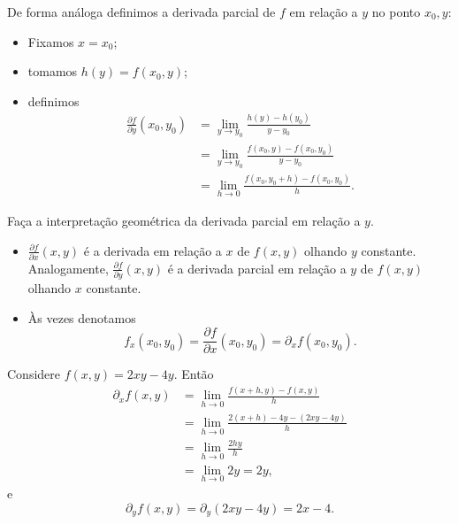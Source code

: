     De forma análoga definimos a derivada parcial de \(f\) em relação a \(y\) no ponto \(x_0,y\):
        \begin{itemize}
            \item Fixamos \(x = x_0\);
            \item tomamos \(h(y) = f(x_0,y)\);
            \item definimos
                \begin{align*}
                    \frac{\partial f}{\partial y}(x_0,y_0) 
                        & = \lim_{y\to y_0} \frac{h(y) - h(y_0)}{y-y_0} \\
                        & = \lim_{y\to y_0} \frac{f(x_0,y) - f(x_0,y_0)}{y-y_0} \\
                        & = \lim_{h\to 0} \frac{f(x_0,y_0 + h) - f(x_0,y_0)}{h}. 
                \end{align*}
        \end{itemize}

\begin{exercise}
    Faça a interpretação geométrica da derivada parcial em relação a \(y\).
\end{exercise}

\begin{remark}
    \begin{itemize}
        \item \(\frac{\partial f}{\partial x}(x,y)\) é a derivada em relação a \(x\) de \(f(x,y)\) olhando \(y\) constante. Analogamente, \(\frac{\partial f}{\partial y}(x,y)\) é a derivada parcial em relação a \(y\) de \(f(x,y)\) olhando \(x\) constante.
        \item Às vezes denotamos \[f_x(x_0,y_0) = \frac{\partial f}{\partial x}(x_0,y_0) = \partial_x f(x_0,y_0).\]
    \end{itemize}
\end{remark}

\begin{example}
    Considere \(f(x,y) = 2xy - 4y\). Então
        \begin{align*}
            \partial_x f(x,y) 
            & = \lim_{h\to 0} \frac{f(x+h,y) - f(x,y)}{h} \\
            & = \lim_{h\to 0} \frac{2(x+h) - 4y - (2xy - 4y)}{h} \\
            & = \lim_{h\to 0}\frac{2hy}{h} \\
            & = \lim_{h\to 0} 2y = 2y, 
        \end{align*}
    e \[\partial_y f(x,y) = \partial_y (2xy - 4y) = 2x - 4.\]
\end{example}

